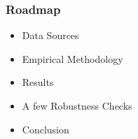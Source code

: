\documentclass[10 pt,Helvetica, french]{beamer}
\begin{document}

\begin{frame}
\frametitle{Roadmap}
\begin{itemize}
\item Data Sources  \vspace{0.2cm}
\item Empirical Methodology \vspace{0.2cm}
\item Results \vspace{0.2cm}
\item A few Robustness Checks \vspace{0.2cm}
\item Conclusion
\end{itemize}
\end{frame}

\end{document}

